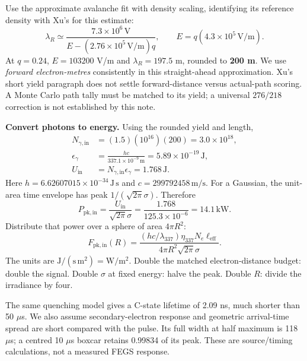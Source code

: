 \documentclass[11pt,a4paper]{article}
\begin{document}
Use the approximate avalanche fit with density scaling, identifying its reference density with Xu's for this estimate:~\cite[Eq.~(3)]{Cramer2016}
\begin{equation}
\lambda_R\simeq\frac{7.3\times10^6\,\mathrm V}
{E-(2.76\times10^5\,\mathrm{V/m})q},\qquad E=q(4.3\times10^5\,\mathrm{V/m}).
\end{equation}
At $q=0.24$, $E=103200$ V/m and $\lambda_R=197.5$ m, rounded to \textbf{200 m}. We use \emph{forward electron-metres} consistently in this straight-ahead approximation. Xu's short yield paragraph does not settle forward-distance versus actual-path scoring. A Monte Carlo path tally must be matched to its yield; a universal $276/218$ correction is not established by this note.

\textbf{Convert photons to energy.} Using the rounded yield and length,
\begin{align}
N_{\gamma,\mathrm{in}}&=(1.5)(10^{16})(200)=3.0\times10^{18},\\
\epsilon_\gamma&=\frac{hc}{337.1\times10^{-9}\,\mathrm m}
=5.89\times10^{-19}\,\mathrm J,\\
U_{\mathrm{in}}&=N_{\gamma,\mathrm{in}}\epsilon_\gamma=1.768\,\mathrm J.
\end{align}
Here $h=6.62607015\times10^{-34}\,\mathrm{J\,s}$ and $c=299792458\,\mathrm{m/s}$. For a Gaussian, the unit-area time envelope has peak $1/(\sqrt{2\pi}\sigma)$. Therefore
\begin{equation}
P_{\mathrm{pk,in}}=\frac{U_{\mathrm{in}}}{\sqrt{2\pi}\sigma}
=\frac{1.768}{125.3\times10^{-6}}=14.1\,\mathrm{kW}.
\end{equation}
Distribute that power over a sphere of area $4\pi R^2$:
\begin{equation}
\boxed{F_{\mathrm{pk,in}}(R)=
\frac{(hc/\lambda_{337})\eta_{337}N_e\ell_{\mathrm{eff}}}
{4\pi R^2\sqrt{2\pi}\sigma}.}\label{eq:flux}
\end{equation}
The units are $\mathrm{J}/(\mathrm{s\,m^2})=\mathrm{W/m^2}$. Double the matched electron-distance budget: double the signal. Double $\sigma$ at fixed energy: halve the peak. Double $R$: divide the irradiance by four.

The same quenching model gives a C-state lifetime of 2.09 ns, much shorter than 50 $\mu$s. We also assume secondary-electron response and geometric arrival-time spread are short compared with the pulse. Its full width at half maximum is 118 $\mu$s; a centred 10 $\mu$s boxcar retains 0.99834 of its peak. These are source/timing calculations, not a measured FEGS response.
\end{document}
